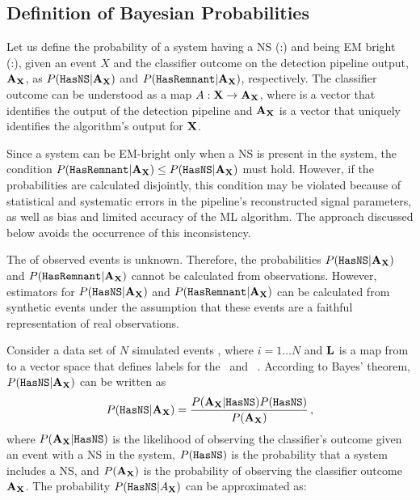 \subsection{Definition of Bayesian Probabilities} \label{bayesian_probs}

Let us define the probability of a system having a \ac{NS} (\hasns:\true) and being \ac{EM} bright (\hasrem:\true), given an event $X$ and the classifier outcome on the detection pipeline
output, ${\bf A}_{\bf X}$, as $P({{\tt HasNS}}|{\bf A}_{\bf X})$ and $P({{\tt HasRemnant}}|{\bf A}_{\bf X})$, respectively. The classifier outcome can be understood as a map $A:{\bf X}\to {\bf A}_{\bf X}$,
where  is a vector that identifies the output of the detection pipeline and ${\bf A}_{\bf X}$ is a vector that uniquely identifies the algorithm's output for $\bf X$. 

Since a system can be EM-bright only when a \ac{NS} is present in the system, the condition $P({{\tt HasRemnant}}|{\bf A}_{\bf X})\le P({{\tt HasNS}}|{\bf A}_{\bf X})$ must hold. However, if the
probabilities are calculated disjointly, this condition may be violated because of statistical and systematic errors in the pipeline's reconstructed signal parameters, as well as bias and
limited accuracy of the \ac{ML} algorithm. The approach discussed below avoids the occurrence of this inconsistency.

The  of observed events is unknown. Therefore, the probabilities $P({{\tt HasNS}}|{\bf A}_{\bf X})$ and $P({{\tt HasRemnant}}|{\bf A}_{\bf X})$ cannot be calculated from observations. However,
estimators for $P({{\tt HasNS}}|{\bf A}_{\bf X})$ and $P({{\tt HasRemnant}}|{\bf A}_{\bf X})$ can be calculated from synthetic events under the assumption that these events are a faithful representation of
real observations.

Consider a data set of $N$ simulated events , where $i=1\dots N$ and ${\bf L}$ is a map from  to a vector space
that defines labels for the \hasns\ and \hasrem\ . According to Bayes' theorem, $P({{\tt HasNS}}|{\bf A}_{\bf X})$  can be written as 
%
\begin{equation}
P({{\tt HasNS}}|{\bf A}_{\bf X})=\frac{P({\bf A}_{\bf X}|{{\tt HasNS}})P({{\tt HasNS}})}{P({\bf A}_{\bf X})}\,,
\label{bayes}
\end{equation}
%
where $P({\bf A}_{\bf X}|{{\tt HasNS}})$ is the likelihood of observing the classifier's outcome given an event with a \ac{NS} in the system, $P({{\tt HasNS}})$ is the probability that a system includes a \ac{NS}, and $P({\bf A}_{\bf X})$ is the probability of observing the classifier outcome ${\bf A}_{\bf X}$. The probability $P({{\tt HasNS}}|A_{\bf X})$ can be approximated as:  
%

